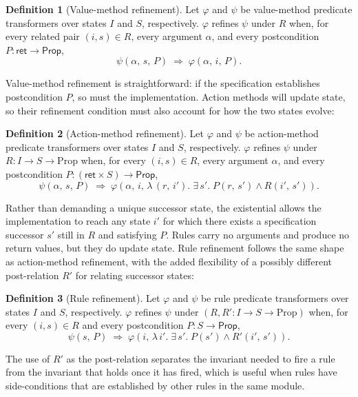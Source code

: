 \documentclass[fontset=fira-newtxsf]{mitthesis}
\theoremstyle{definition}
\newtheorem{definition}{Definition}[section]
\theoremstyle{plain}
\begin{document}
\begin{definition}[Value-method refinement] \label{def:refines-value}
Let $\varphi$ and $\psi$ be value-method predicate transformers over states $I$ and $S$, respectively.
$\varphi$ refines $\psi$ under $R$ when, for every related pair $(i, s) \in R$, every argument $\alpha$, and every postcondition $P : \textsf{ret} \to \textsf{Prop}$,
\[
  \psi(\alpha,\, s,\, P) \;\Rightarrow\; \varphi(\alpha,\, i,\, P).
\]
\end{definition}

Value-method refinement is straightforward: if the specification establishes postcondition $P$, so must the implementation.
Action methods will update state, so their refinement condition must also account for how the two states evolve:

\begin{definition}[Action-method refinement] \label{def:refines-action}
Let $\varphi$ and $\psi$ be action-method predicate transformers over states $I$ and $S$, respectively.
$\varphi$ refines $\psi$ under $R : I \to S \to \text{Prop}$ when, for every $(i, s) \in R$, every argument $\alpha$, and every postcondition $P : (\textsf{ret} \times S) \to \textsf{Prop}$,
\[
  \psi(\alpha,\, s,\, P)
  \;\Rightarrow\;
  \varphi(\alpha,\, i,\, \lambda\,(r,\,i').\;
    \exists\, s'.\; P(r,\, s') \land R(i',\, s')).
\]
\end{definition}

Rather than demanding a unique successor state, the existential allows the implementation to reach any state $i'$ for which there exists a specification successor $s'$ still in $R$ and satisfying $P$.
Rules carry no arguments and produce no return values, but they do update state.
Rule refinement follows the same shape as action-method refinement, with the added flexibility of a possibly different post-relation $R'$ for relating successor states:

\begin{definition}[Rule refinement] \label{def:refines-rules}
Let $\varphi$ and $\psi$ be rule predicate transformers over states $I$ and $S$, respectively.
$\varphi$ refines $\psi$ under $(R, R' : I \to S \to \text{Prop})$ when, for every $(i, s) \in R$ and every postcondition $P : S \to \textsf{Prop}$,
\[
  \psi(s,\, P)
  \;\Rightarrow\;
  \varphi(i,\, \lambda\, i'.\;
    \exists\, s'.\; P(s') \land R'(i',\, s')).
\]
\end{definition}

The use of $R'$ as the post-relation separates the invariant needed to fire a rule from the invariant that holds once it has fired, which is useful when rules have side-conditions that are established by other rules in the same module.
\end{document}
